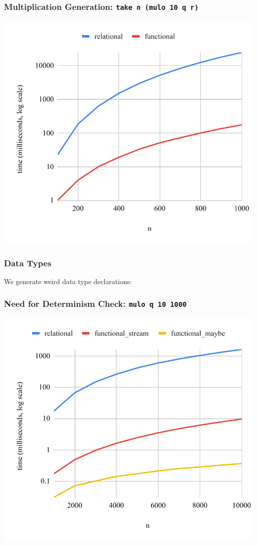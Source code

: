 \documentclass[xcolor=table]{beamer}
\begin{document}
\begin{frame}[fragile]
  \frametitle{Multiplication Generation: \lstinline[basicstyle=\Large]{take n (mulo 10 q r)}}
  \begin{center}
    \includegraphics[height=0.85\textheight]{figures/muloIOI.pdf}
  \end{center}
\end{frame}

\begin{frame}[fragile]
  \frametitle{Data Types}
We generate weird data type declarations:

\end{frame}

\begin{frame}[fragile]
  \frametitle{Need for Determinism Check: \lstinline[basicstyle=\Large]{mulo q 10 1000}}
  \begin{center}
    \includegraphics[height=0.85\textheight]{figures/maybe.pdf}
  \end{center}
\end{frame}
\end{document}
